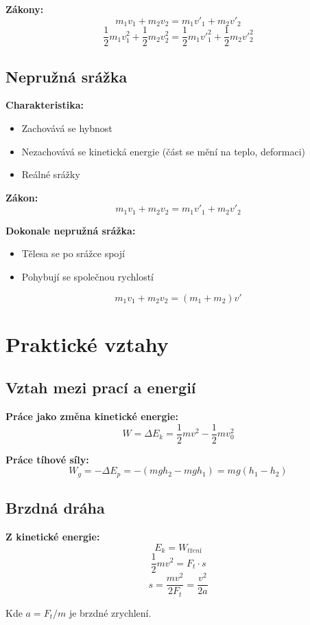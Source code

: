 \documentclass[11pt,a4paper]{article}
\begin{document}
\textbf{Zákony:}
\[m_1v_1 + m_2v_2 = m_1v'_1 + m_2v'_2\]
\[\frac{1}{2}m_1v_1^2 + \frac{1}{2}m_2v_2^2 = \frac{1}{2}m_1v'^2_1 + \frac{1}{2}m_2v'^2_2\]

\subsection{Nepružná srážka}

\textbf{Charakteristika:}
\begin{itemize}
\item Zachovává se hybnost
\item Nezachovává se kinetická energie (část se mění na teplo, deformaci)
\item Reálné srážky
\end{itemize}

\textbf{Zákon:}
\[m_1v_1 + m_2v_2 = m_1v'_1 + m_2v'_2\]

\textbf{Dokonale nepružná srážka:}
\begin{itemize}
\item Tělesa se po srážce spojí
\item Pohybují se společnou rychlostí
\end{itemize}

\[m_1v_1 + m_2v_2 = (m_1 + m_2)v'\]

\clearpage

\section{Praktické vztahy}

\subsection{Vztah mezi prací a energií}

\textbf{Práce jako změna kinetické energie:}
\[W = \Delta E_k = \frac{1}{2}mv^2 - \frac{1}{2}mv_0^2\]

\textbf{Práce tíhové síly:}
\[W_g = -\Delta E_p = -(mgh_2 - mgh_1) = mg(h_1 - h_2)\]

\subsection{Brzdná dráha}

\textbf{Z kinetické energie:}
\[E_k = W_{tření}\]
\[\frac{1}{2}mv^2 = F_t \cdot s\]
\[s = \frac{mv^2}{2F_t} = \frac{v^2}{2a}\]

Kde $a = F_t/m$ je brzdné zrychlení.
\end{document}
